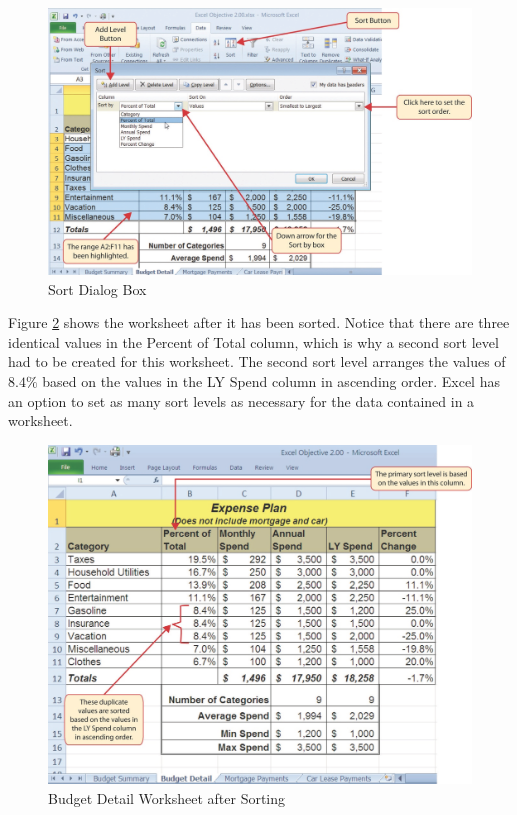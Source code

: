 \begin{figure}[H]
	\centering
	\includegraphics[width=\maxwidth{.95\linewidth}]{gfx/ch02_fig27}
	\caption{Sort Dialog Box}
	\label{02:fig27}
\end{figure}

Figure \ref{02:fig28} shows the  worksheet after it has been sorted. Notice that there are three identical values in the Percent of Total column, which is why a second sort level had to be created for this worksheet. The second sort level arranges the values of $ 8.4\% $ based on the values in the LY Spend column in ascending order. Excel has an option to set as many sort levels as necessary for the data contained in a worksheet.

\begin{figure}[H]
	\centering
	\includegraphics[width=\maxwidth{.95\linewidth}]{gfx/ch02_fig28}
	\caption{Budget Detail Worksheet after Sorting}
	\label{02:fig28}
\end{figure}

